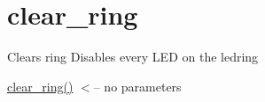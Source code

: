 \hypertarget{clear_ring-example}{\section{clear\-\_\-ring}
}
Clears ring Disables every L\-E\-D on the ledring

\hyperlink{header_8h_ad1b96d3871fe1da08f08711a8db49589}{clear\-\_\-ring()} $<$-- no parameters


\begin{DoxyCodeInclude}
\end{DoxyCodeInclude}
 